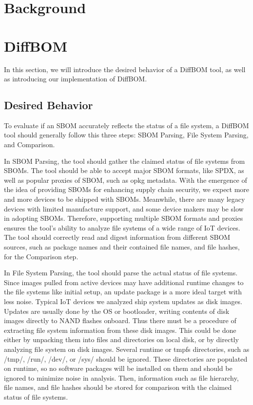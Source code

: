 \section{Background}


\section{DiffBOM}

In this section, we will introduce the desired behavior of a DiffBOM tool, as well as introducing our implementation of DiffBOM.
\subsection{Desired Behavior}
To evaluate if an SBOM accurately reflects the status of a file system, a DiffBOM tool should generally follow this three steps: SBOM Parsing, File System Parsing, and Comparison.\par
In SBOM Parsing, the tool should gather the claimed status of file systems from SBOMs. The tool should be able to accept major SBOM formats, like SPDX, as well as popular proxies of SBOM, such as opkg metadata. With the emergence of the idea of providing SBOMs for enhancing supply chain security, we expect more and more devices to be shipped with SBOMs. Meanwhile, there are many legacy devices with limited manufacture support, and some device makers may be slow in adopting SBOMs. Therefore, supporting multiple SBOM formats and proxies ensures the tool's ability to analyze file systems of a wide range of IoT devices. The tool should correctly read and digest information from different SBOM sources, such as package names and their contained file names, and file hashes, for the Comparison step.\par
In File System Parsing, the tool should parse the actual status of file systems. Since images pulled from active devices may have additional runtime changes to the file systems like initial setup, an update package is a more ideal target with less noise. Typical IoT devices we analyzed ship system updates as disk images. Updates are usually done by the OS or bootloader, writing contents of disk images directly to NAND flashes onboard. Thus there must be a procedure of extracting file system information from these disk images. This could be done either by unpacking them into files and directories on local disk, or by directly analyzing file system on disk images. Several runtime or tmpfs directories, such as /tmp/, /run/, /dev/, or /sys/ should be ignored. These directories are populated on runtime, so no software packages will be installed on them and should be ignored to minimize noise in analysis. Then, information such as file hierarchy, file names, and file hashes should be stored for comparison with the claimed status of file systems.\par
